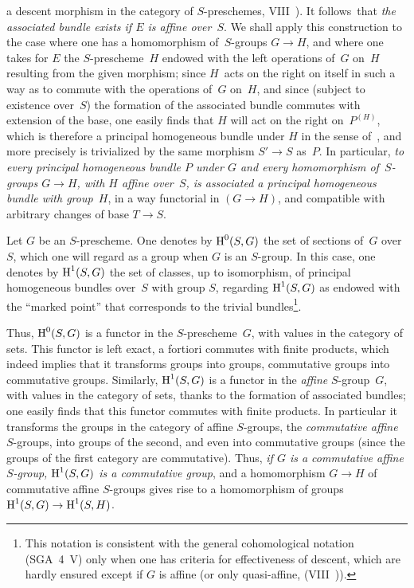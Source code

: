 a descent morphism in the category of
$S$-preschemes, \cf VIII~). It follows~that
\emph{the associated bundle exists if $E$ is affine over~$S$}. We
shall apply this construction to the case where one has a homomorphism of~$S$-groups $G\to H$, and where one takes for $E$ the $S$-prescheme~$H$ endowed with the left operations of~$G$ on~$H$ resulting
from the given morphism; since $H$~acts on the right on
itself in such a way as to commute with the operations of~$G$
on~$H$, and since (subject to existence over~$S$) the
formation of the associated bundle commutes with extension of the
base, one easily finds that $H$ will act on the right on~$P^{(H)}$, which is therefore a principal homogeneous bundle
under $H$ in the sense of~, and
more precisely is trivialized by the same
morphism $S'\to S$ as~$P$. In particular, \emph{to every
principal homogeneous bundle $P$ under $G$ and every homomorphism of~$S$-groups $G\to H$, with $H$ affine over~$S$, is associated a
principal homogeneous bundle with group~$H$}, in a way
functorial in $(G\to H)$, and compatible with arbitrary changes of base
$T\to S$.

\begin{definition}
\label{XI.4.4}
Let $G$ be an $S$-prescheme. One denotes by $\operatorname{H}^0(S,G)$ the set of
sections of~$G$ over~$S$, which one will regard as a group when
$G$ is an $S$-group. In this case, one denotes by $\operatorname{H}^1(S,G)$ the set of
classes, up to isomorphism, of principal homogeneous
bundles over~$S$ with group $S$, regarding $\operatorname{H}^1(S,G)$
as endowed with the ``marked point'' that corresponds to the trivial
bundles\footnote{\label{note-296}This notation is consistent
with the general cohomological notation (SGA~4~V)
only when one has criteria for effectiveness of descent,
which are hardly ensured except if $G$ is affine (or only
quasi-affine, \cf (VIII~)).}.
\end{definition}

Thus, $\operatorname{H}^0(S,G)$ is a functor in the $S$-prescheme~$G$,
with values in the category of sets. This functor is
left exact, a fortiori commutes with finite products, which
indeed implies that it transforms groups into groups, commutative
groups into commutative groups. Similarly,
$\operatorname{H}^1(S,G)$ is a functor in the \emph{affine} $S$-group~$G$, with
values in the category of sets, thanks to the
formation of associated bundles; one easily finds that this
functor commutes with finite products. In particular it transforms the
groups in the category of affine $S$-groups, \ie the
\emph{commutative affine} $S$-groups, into groups of the second,
and even into commutative groups (since the groups of the
first category are commutative). Thus, \emph{if $G$ is
a commutative affine $S$-group, $\operatorname{H}^1(S,G)$ is a commutative
group}, and a homomorphism $G\to H$ of commutative affine $S$-groups
gives rise to a homomorphism of groups
$\H^1(S,G)\to\H^1(S,H)$.

